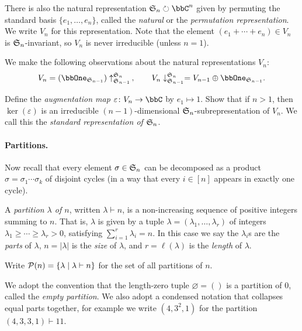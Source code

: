 There is also the natural representation $\sym{n}\circlearrowright \bbC^n$ given
by permuting the standard basis $\{e_1,\ldots, e_n\}$, called the \emph{natural} or the
\emph{permutation representation}. We write $V_n$ for this representation. Note
that the element $(e_1+\cdots + e_n)\in V_n$ is $\mathfrak{S}_{n}$-invariant, so $V_n$ is
never irreducible (unless $n=1$).

We make the following observations about the natural representations $V_n$: 
\begin{gather*}
    V_n = (\bbOne_{\sym{n-1}})\uparrow^{\sym{n}}_{\sym{n-1}}\,, \qquad V_n
    \downarrow^{\sym{n}}_{\sym{n-1}} = V_{n-1} \oplus \bbOne_{\sym{n-1}}.
\end{gather*}

\begin{exercise}
    Define the \emph{augmentation map} $\varepsilon\colon V_n\to \bbC$ by
    $e_1\mapsto 1$. Show that if $n>1$, then $\ker(\varepsilon)$ is an irreducible
    $(n-1)$-dimensional $\mathfrak{S}_{n}$-subrepresentation of $V_n$. We call this the
    \emph{standard representation of $\mathfrak{S}_{n}$}.
\end{exercise}

\paragraph{Partitions.} Now recall that every element $\sigma\in \mathfrak{S}_{n}$ can be
decomposed as a product $\sigma = \sigma_1\cdots \sigma_k$ of disjoint cycles
(in a way that every $i\in [n]$ appears in exactly one cycle).

\begin{definition}
    A \emph{partition $\lambda$ of $n$}, written $\lambda \vdash n$, is a
    non-increasing sequence of positive integers summing to $n$. That is,
    $\lambda$ is given by a tuple \(\lambda = (\lambda_1,\ldots,\lambda_r)\) of
    integers \(\lambda_1\geq \cdots \geq \lambda_r> 0\), satisfying
    \(\sum_{i=1}^r\lambda_i = n\). In this case we say the $\lambda_i$s are the \emph{parts} of $\lambda$, $n=|\lambda|$ is
    the \emph{size} of $\lambda$, and $r=\ell(\lambda)$ is the \emph{length} of
    $\lambda$. 

    Write $\mathcal{P}(n)=\{\lambda\;|\; \lambda\vdash n\}$ for the set of all
    partitions of $n$.
\end{definition}

We adopt the convention that the length-zero tuple $\varnothing = ()$ is a partition
of $0$, called the \emph{empty partition}. We also adopt a condensed notation
that collapses equal parts together, for example we write $(4,3^2,1)$ for the
partition $(4,3,3,1)\vdash 11$.

